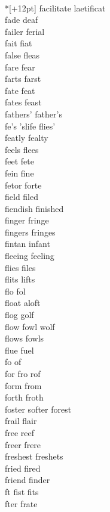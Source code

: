 \vspace{14pt}
\noindent\notextbf{\LargeF}\\*[+12pt]
facilitate laetificat\\
fade deaf\\
failer ferial\\
fait fiat\\
false fleas\\
fare fear\\
farts farst\\
fate feat\\
fates feast\\
fathers' father's\\
fe's 'slife flies'  \\
featly fealty\\
feels flees\\
feet fete\\
fein fine\\
fetor forte\\
field filed\\
fiendish finished\\
finger fringe\\
fingers fringes\\
fintan infant\\
fleeing feeling\\
flies files\\
flits lifts\\
flo fol\\
float aloft\\
flog golf\\
flow fowl wolf\\
flows fowls\\
flue fuel\\
fo of\\
for fro rof\\
form from\\
forth froth\\
foster softer forest\\
frail flair\\
free reef\\
freer frere\\
freshest freshets\\
fried fired\\
friend finder\\
ft fist fits  \\
fter frate \\

